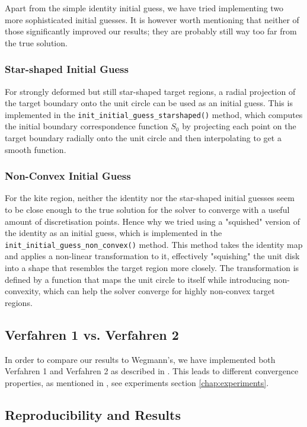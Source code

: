 Apart from the simple identity initial guess, we have tried implementing two more sophisticated initial guesses. 
It is however worth mentioning that neither of those significantly improved our results; they are probably still way too far from the true solution.
\subsubsection{Star-shaped Initial Guess}
For strongly deformed but still star-shaped target regions, a radial projection of the target boundary onto the unit circle can be used as an initial guess. This is implemented in the \texttt{init\_initial\_guess\_starshaped()} method, which computes the initial boundary correspondence function $S_0$ by projecting each point on the target boundary radially onto the unit circle and then interpolating to get a smooth function.
\subsubsection{Non-Convex Initial Guess}
For the kite region, neither the identity nor the star-shaped initial guesses seem to be close enough to the true solution for the solver to converge with a useful amount of discretisation points. Hence why we tried using a "squished" version of the identity as an initial guess, which is implemented in the \texttt{init\_initial\_guess\_non\_convex()} method. This method takes the identity map and applies a non-linear transformation to it, effectively "squishing" the unit disk into a shape that resembles the target region more closely. The transformation is defined by a function that maps the unit circle to itself while introducing non-convexity, which can help the solver converge for highly non-convex target regions.

\subsection{Verfahren 1 vs. Verfahren 2} \label{chap:verfahren1-2}
In order to compare our results to Wegmann's, we have implemented both Verfahren 1 and Verfahren 2 as described in \cite[§5]{Wegmann1978_newtonverfahren}.
This leads to different convergence properties, as mentioned in \cite[§5]{Wegmann1978_newtonverfahren}, see experiments section \ref{chap:experiments}.

\subsection{Reproducibility and Results}
